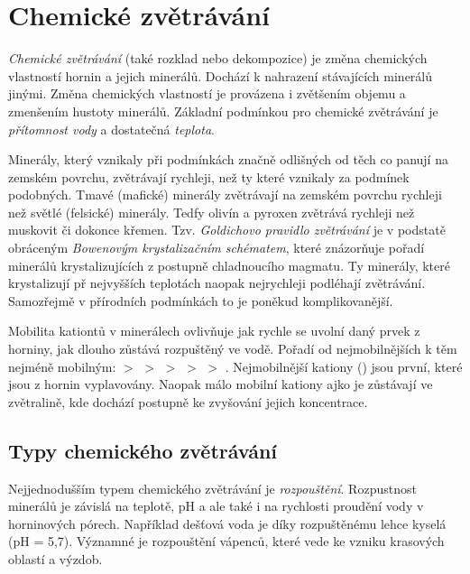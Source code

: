 \section{Chemické zvětrávání}
\emph{Chemické zvětrávání} (také rozklad nebo dekompozice) je změna chemických vlastností hornin a jejich minerálů. Dochází k nahrazení stávajících minerálů jinými. Změna chemických vlastností je provázena i zvětšením objemu a zmenšením hustoty minerálů. Základní podmínkou pro chemické zvětrávání je \emph{přítomnost vody} a dostatečná \emph{teplota}.

Minerály, který vznikaly při podmínkách značně odlišných od těch co panují na zemském povrchu, zvětrávají rychleji, než ty které vznikaly za podmínek podobných. Tmavé (mafické) minerály zvětrávají na zemském povrchu rychleji než světlé (felsické) minerály. Tedfy olivín a pyroxen zvětrává rychleji než muskovit či dokonce křemen. Tzv. \emph{Goldichovo pravidlo zvětrávání} je v podstatě obráceným \emph{Bowenovým krystalizačním schématem}, které znázorňuje pořadí minerálů krystalizujících z postupně chladnoucího magmatu. Ty minerály, které krystalizují př nejvyšších teplotách naopak nejrychleji podléhají zvětrávání. Samozřejmě v přírodních podmínkách to je poněkud komplikovanější. 

Mobilita kationtů v minerálech ovlivňuje jak rychle se uvolní daný prvek z horniny, jak dlouho zůstává rozpuštěný ve vodě. Pořadí od nejmobilnějších k těm nejméně mobilným:  $>$  $>$  $>$  $>$  $>$ . Nejmobilnější kationy () jsou první, které jsou z hornin vyplavovány. Naopak málo mobilní kationy ajko je  zůstávají ve zvětralině, kde dochází postupně ke zvyšování jejich koncentrace. 

\subsection{Typy chemického zvětrávání}
Nejjednodušším typem chemického zvětrávání je \emph{rozpouštění}. Rozpustnost minerálů je závislá na teplotě, pH a ale také i na rychlosti proudění vody v horninových pórech. Například dešťová voda je díky rozpuštěnému  lehce kyselá (pH = 5,7). Významné je rozpouštění vápenců, které vede ke vzniku krasových oblastí a výzdob. 
%

